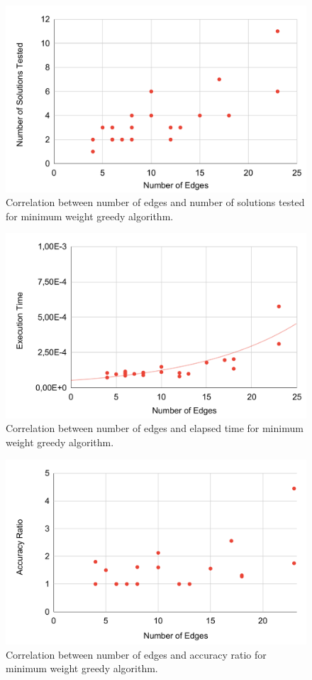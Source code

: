 \begin{figure}[!ht]
    \centering
    \includegraphics[width=0.9\linewidth]{figs/minw-solutions.pdf}
    \caption{Correlation between number of edges and number of solutions tested for minimum weight greedy algorithm.}
    \label{fig:minw-sol}
\end{figure}


\begin{figure}[!ht]
    \centering
    \includegraphics[width=0.9\linewidth]{figs/minw-time.pdf}
    \caption{Correlation between number of edges and elapsed time for minimum weight greedy algorithm.}
    \label{fig:minw-time}
\end{figure}

\newpage

\begin{figure}[!ht]
    \centering
    \includegraphics[width=0.9\linewidth]{figs/minw-ratio.pdf}
    \caption{Correlation between number of edges and accuracy ratio for minimum weight greedy algorithm.}
    \label{fig:minw-ratio}
\end{figure}


